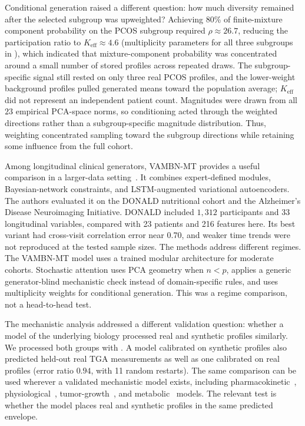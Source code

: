 Conditional generation raised a different question: how much diversity remained after the
selected subgroup was upweighted? Achieving
80\% of finite-mixture component probability on the PCOS subgroup required
$\rho \approx 26.7$, reducing the participation ratio to
$K_{\text{eff}} \approx 4.6$ (multiplicity parameters
for all three subgroups in ),
which indicated that mixture-component probability was concentrated around a small number
of stored profiles across repeated draws. The subgroup-specific signal still rested on only
three real PCOS profiles, and the lower-weight background profiles pulled generated means
toward the population average; $K_{\text{eff}}$ did not represent an independent patient
count. Magnitudes were drawn from all $23$ empirical PCA-space norms, so conditioning acted
through the weighted directions rather than a subgroup-specific magnitude distribution.
Thus, weighting concentrated sampling toward the subgroup directions while retaining some
influence from the full cohort.

Among longitudinal clinical generators, VAMBN-MT provides a useful comparison in a
larger-data setting~\citep{Kuhnel2024}. It combines
expert-defined modules, Bayesian-network constraints, and LSTM-augmented variational
autoencoders. The authors evaluated it on the DONALD nutritional cohort and the Alzheimer's
Disease Neuroimaging Initiative. DONALD included $1{,}312$ participants and 33 longitudinal
variables, compared with 23 patients and 216 features here. Its best variant had cross-visit
correlation error near 0.70, and weaker time trends were not reproduced at the tested sample
sizes. The methods address different regimes. The VAMBN-MT model uses a trained modular architecture
for moderate cohorts. Stochastic attention uses PCA geometry when $n<p$, applies a generic
generator-blind mechanistic check instead of domain-specific rules, and uses multiplicity
weights for conditional generation. This was a regime comparison, not a head-to-head test.

The mechanistic analysis addressed a different validation question: whether a model of the
underlying biology processed real and synthetic profiles similarly. We processed both groups
with . A model calibrated on synthetic profiles also
predicted held-out real TGA measurements as well as one calibrated on real profiles (error
ratio $0.94$, with 11 random restarts). The same comparison can be used wherever a validated
mechanistic model exists, including pharmacokinetic~\citep{MouldUpton2013},
physiological~\citep{Chase2011}, tumor-growth~\citep{Ribba2012}, and
metabolic~\citep{Yizhak2015,Shan2018} models. The relevant test is whether the model places
real and synthetic profiles in the same predicted envelope.

